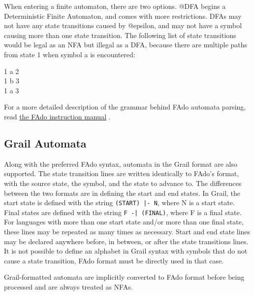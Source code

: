 \documentclass{article}
\begin{document}
\par When entering a finite automaton, there are two options.
@DFA begins a Deterministic Finite Automaton, and comes with more restrictions.
DFAs may not have any state transitions caused by @epsilon, and may not have a symbol causing more than one state transition.
The following list of state transitions would be legal as an NFA but illegal as a DFA, because there are multiple paths from state 1 when symbol a is encountered:
\begin{center}
1 a 2\\
1 b 3\\
1 a 3\\
\end{center}

\par For a more detailed description of the grammar behind FAdo automata parsing, read \href{https://www.dcc.fc.up.pt/~rvr/FAdo.pdf}{the FAdo instruction manual} \cite{FAdoManual}.

\subsection{Grail Automata}
Along with the preferred FAdo syntax, automata in the Grail\cite{Grail} format are also supported.
The state transition lines are written identically to FAdo's format, with the source state, the symbol, and the state to advance to.
The differences between the two formats are in defining the start and end states.
In Grail, the start state is defined with the string \verb=(START) |- N=, where N is a start state.
Final states are defined with the string \verb=F -| (FINAL)=, where F is a final state.
For languages with more than one start state and/or more than one final state, these lines may be repeated as many times as necessary.
Start and end state lines may be declared anywhere before, in between, or after the state transitions lines.
It is not possible to define an alphabet in Grail syntax with symbols that do not cause a state transition, FAdo format must be directly used in that case.

Grail-formatted automata are implicitly converted to FAdo format before being processed and are always treated as NFAs.
\end{document}
